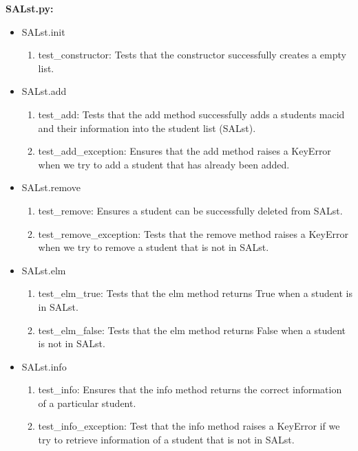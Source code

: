 \documentclass[12pt]{article}
\begin{document}
\textbf{SALst.py:}
\begin{itemize}

  \item SALst.init
    \begin{enumerate}
      \item test\_constructor: Tests that the constructor successfully creates a empty list.
    \end{enumerate}

  \item SALst.add
    \begin{enumerate}
      \item test\_add: Tests that the add method successfully adds a students macid and their information into the
      student list (SALst).
      \item test\_add\_exception: Ensures that the add method raises a KeyError when we try to add a student that has
      already been added.
    \end{enumerate}

  \item SALst.remove
    \begin{enumerate}
      \item test\_remove: Ensures a student can be successfully deleted from SALst.
      \item test\_remove\_exception: Tests that the remove method raises a KeyError when we try to remove a student
      that is not in SALst.
    \end{enumerate}

  \item SALst.elm
    \begin{enumerate}
      \item test\_elm\_true: Tests that the elm method returns True when a student is in SALst.
      \item test\_elm\_false: Tests that the elm method returns False when a student is not in SALst.
    \end{enumerate}

  \item SALst.info
    \begin{enumerate}
      \item test\_info: Ensures that the info method returns the correct information of a particular student.
      \item test\_info\_exception: Test that the info method raises a KeyError if we try to retrieve information of
      a student that is not in SALst.
    \end{enumerate}


\end{itemize}
\end{document}
